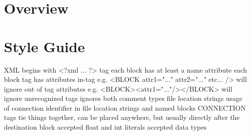 \documentclass{article}
\begin{document}
\section{Overview}
\section{Style Guide}
XML
begins with <?xml ... ?> tag
each block has at least a name attribute
each block tag has attributes in-tag e.g. <BLOCK attr1="..." attr2="..." etc... />
will ignore out of tag attributes e.g. <BLOCK><attr1="..."/></BLOCK>
will ignore unrecognized tags
ignores both comment types
file location strings
usage of connection identifier in file location strings and named blocks
CONNECTION tags tie things together, can be placed anywhere, but usually directly after the destination block
accepted float and int literals
accepted data types
\end{document}
